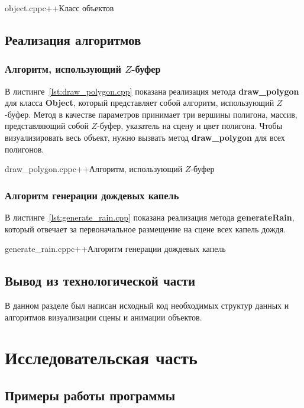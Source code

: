 {object.cpp}{c++}{Класс объектов}

\section{Реализация алгоритмов}

\subsection{Алгоритм, использующий $Z$-буфер}

В листинге~\ref{lst:draw_polygon.cpp} показана реализация метода \textbf{draw\_polygon} для класса \textbf{Object}, который представляет собой алгоритм, использующий $Z$-буфер. 
Метод в качестве параметров принимает три вершины полигона, массив, представляющий собой $Z$-буфер, указатель на сцену и цвет полигона. 
Чтобы визуализировать весь объект, нужно вызвать метод \textbf{draw\_polygon} для всех полигонов.

{draw_polygon.cpp}{c++}{Алгоритм, использующий $Z$-буфер}

\subsection{Алгоритм генерации дождевых капель}

В листинге~\ref{lst:generate_rain.cpp} показана реализация метода \textbf{generateRain}, который отвечает за первоначальное размещение на сцене всех капель дождя.

{generate_rain.cpp}{c++}{Алгоритм генерации дождевых капель}

\section*{Вывод из технологической части}

В данном разделе был написан исходный код необходимых структур данных и алгоритмов визуализации сцены и анимации объектов. 

\chapter{Исследовательская часть}

\section*{Примеры работы программы}

